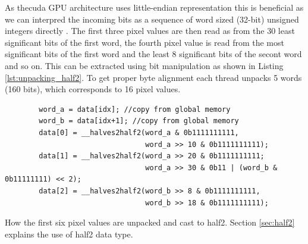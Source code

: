 As the\gls{cuda} GPU architecture uses little-endian representation this is beneficial as we can interpred the incoming bits as a sequence of word sized (32-bit) unsigned integers directly \cite[127]{nvidiaCUDAProgrammingGuide}.
The first three pixel values are then read as from the 30 least significant bits of the first word, the fourth pixel value is read from the most significant bits of the first word and the least 8 significant bits of the secont word and so on.
This can be extracted using bit manipulation as shown in Listing \ref{lst:unpacking_half2}.
To get proper byte alignment each thread unpacks 5 words (160 bits), which corresponds to 16 pixel values.

\begin{listing}
    \begin{verbatim}
        word_a = data[idx]; //copy from global memory
        word_b = data[idx+1]; //copy from global memory
        data[0] = __halves2half2(word_a & 0b1111111111,
                                 word_a >> 10 & 0b1111111111);
        data[1] = __halves2half2(word_a >> 20 & 0b1111111111;
                                 word_a >> 30 & 0b11 | (word_b & 0b11111111) << 2);
        data[2] = __halves2half2(word_b >> 8 & 0b1111111111,
                                 word_b >> 18 & 0b1111111111);
    \end{verbatim}
    \caption{How the first six pixel values are unpacked and cast to \gls{half2}. Section \ref{sec:half2} explains the use of \gls{half2} data type.}
    \label{lst:unpacking_half2}
\end{listing}
